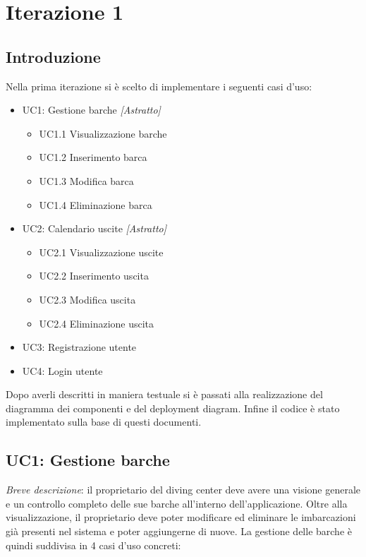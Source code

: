 \chapter{Iterazione 1}

\section{Introduzione}
Nella prima iterazione si è scelto di implementare i seguenti casi d'uso:

\begin{itemize}
    \item UC1: Gestione barche \textit{[Astratto]}
          \begin{itemize}
              \item UC1.1 Visualizzazione barche
              \item UC1.2 Inserimento barca
              \item UC1.3 Modifica barca
              \item UC1.4 Eliminazione barca
          \end{itemize}
    \item UC2: Calendario uscite \textit{[Astratto]}
          \begin{itemize}
              \item UC2.1 Visualizzazione uscite
              \item UC2.2 Inserimento uscita
              \item UC2.3 Modifica uscita
              \item UC2.4 Eliminazione uscita
          \end{itemize}
    \item UC3: Registrazione utente
    \item UC4: Login utente
\end{itemize}
Dopo averli descritti in maniera testuale si è passati alla realizzazione del diagramma dei componenti e del deployment diagram.
Infine il codice è stato implementato sulla base di questi documenti.

\section{UC1: Gestione barche}

\emph{Breve descrizione}: il proprietario del diving center deve avere una visione generale e un controllo completo delle sue barche all'interno dell'applicazione.
Oltre alla visualizzazione, il proprietario deve poter modificare ed eliminare le imbarcazioni già presenti nel sistema e poter aggiungerne di nuove.
La gestione delle barche è quindi suddivisa in 4 casi d'uso concreti:

